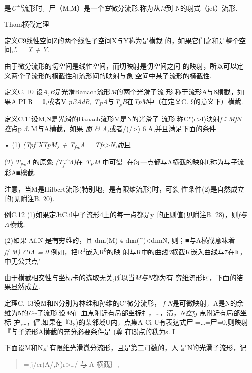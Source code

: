 是\emph{C\textsuperscript{+i}}流形时，尸（M,M）是一个\emph{甘}微分流形,称为从\emph{M}到
N的射式（jet）流形.

Thom横截定理

定义C9线性空间Z的两个线性子空间X与Y称为是横栽
的，如果它们之和是整个空间\emph{,L = X + Y.}

由于微分流形的切空间是线性空间，而切映射是切空间之间
的映射，所以可以定义两个子流形的横截性和流形间的映射与象
空间中某子流形的横截性.

定义C. 10 设\emph{A,B}是光滑Banach流形\emph{M}的两个光滑子流
形.称于流形A与8横截，如果A PI B = 0,或者V \emph{pEAdB,
T\textsubscript{P}A}与\emph{T\textsubscript{p}B}在\emph{TpM}中（在定义C.
9的意义下）横截.

定义C.11设M,N是光滑的Banach流形M是N的光滑子
流形.称C"(r\textgreater{}l)映射\emph{f：MfN在}点p £ M与A横截，如果
\emph{面 \& A,}或者/(/\textgreater{}) 6 A,并且满足下面的条件

• (1) \emph{(Tpf'XTpM) + T\textsubscript{fw}A = Tfs\textgreater{}N,而}且

(2) \emph{T\textsubscript{fw}A}
的原象\emph{.(T\textsubscript{f}\^{}A)}在 \emph{T\textsubscript{P}M}
中可裂. 在每一点都与A横截的映射f,称为与子流彩A■檎截.

注意，当M是Hilbert流形(特别地，是有限维流形)时，可裂
性条件(2)是自然成立的(见附注B. 20).

例C.12 (1)如果定JtC.il中子流形4上的每一点都是y 的正则值(见附注B.
28)，则\emph{f与A}横截.

(2)如果 Af,N 是有穷维的，且 dim(M) 4-dini(\^{})\textless{}dimN,
则；■与A横截意味着\emph{f(.M) CIA =
0.}例如，把R\textsuperscript{1}嵌入R\textsuperscript{5}的映
射与R中的曲线\emph{7}横截K嵌入曲线与7在It，中无公共点'

由于横截相交性与坐标卡的选取无关,所以当\emph{M与N}都为有
穷维流形时，下面的结果显然成立.

定理C. 13设M和N分别为林维和孙维的C"微分流形， \emph{f
N}是可微映射，A是N的余维为5的\emph{C\textasciitilde{}}子流形.设\emph{M}在
血点附近有局部坐标扌，\ldots{}，漬，\emph{N在fg} 点附近有局部坐标
护,\ldots{}，俨.如果在『3。)的某邻域U内，点集A Ci U有表达式尸
=\ldots{}=尸=0,则映射『与子流形A横截的充分必要条件是 (尊\textbar{}
在⑶点的秩为s. I

下面设M和N是有限维光滑微分流形，且是第二可数的，人 是N的光滑子流形，记

\begin{quote}
= j/er(A/,N)\textbar{}r\textgreater{}l,/ 与 A 横截｝,
\end{quote}

